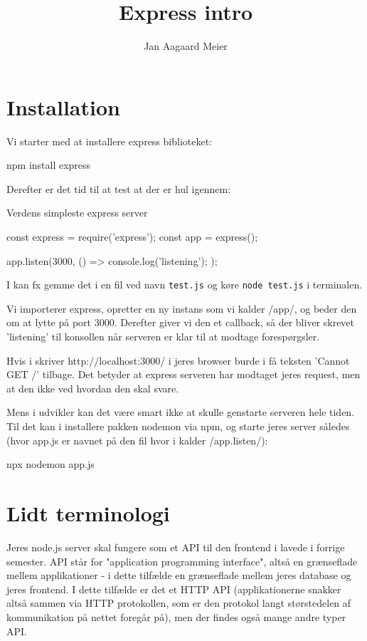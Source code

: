 \documentclass[english,course]{lecture}
\title{Express intro}
\author{Jan Aagaard Meier}
\begin{document}
\section{Installation}
Vi starter med at installere express biblioteket:

\begin{bashcode}
npm install express
\end{bashcode}

Derefter er det tid til at test at der er hul igennem:

\begin{listing}[H]
\caption{Verdens simpleste express server}
\label{lst:testconnection}
\begin{jscode}
const express = require('express');
const app = express();

app.listen(3000, () => {
	console.log('listening');
});
\end{jscode}
\end{listing}

I kan fx gemme det i en fil ved navn \texttt{test.js} og køre \texttt{node test.js} i terminalen.

Vi importerer express, opretter en ny instans som vi kalder \jsinline/app/, og beder den om at lytte på port 3000. Derefter giver vi den et callback, så der bliver skrevet 'listening' til konsollen når serveren er klar til at modtage forespørgsler.

Hvis i skriver http://localhost:3000/ i jeres browser burde i få teksten 'Cannot GET /' tilbage. Det betyder at express serveren har modtaget jeres request, men at den ikke ved hvordan den skal svare.

Mens i udvikler kan det være smart ikke at skulle genstarte serveren hele tiden. Til det kan i installere pakken nodemon via npm, og starte jeres server således (hvor app.js er navnet på den fil hvor i kalder \jsinline/app.listen/):

\begin{bashcode}
npx nodemon app.js
\end{bashcode}

\section{Lidt terminologi}

Jeres node.js server skal fungere som et API til den frontend i lavede i forrige semester. API står for "application programming interface", altså en grænseflade mellem applikationer - i dette tilfælde en grænseflade mellem jeres database og jeres frontend. I dette tilfælde er det et HTTP API (applikationerne snakker altså sammen via HTTP protokollen, som er den protokol langt størstedelen af kommunikation på nettet foregår på), men der findes også mange andre typer API.
\end{document}

